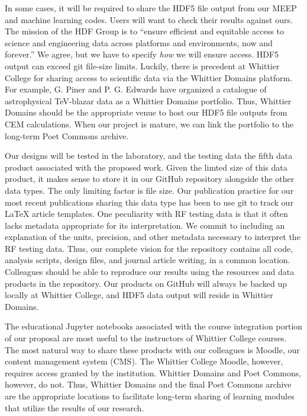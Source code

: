 \documentclass[11pt]{amsart}
\begin{document}
In some cases, it will be required to share the HDF5 file output from our MEEP and machine learning codes.  Users will want to check their results against ours.  The mission of the HDF Group is to ``ensure efficient and equitable access to science and engineering data across platforms and environments, now and forever.''  We agree, but we have to specify \textit{how} we will ensure access.  HDF5 output can exceed git file-size limits.  Luckily, there is precedent at Whittier College for sharing access to scientific data via the Whittier Domains platform.  For example, G. Piner and P. G. Edwards have organized a catalogue of astrophysical TeV-blazar data as a Whittier Domains portfolio.  Thus, Whittier Domains should be the appropriate venue to host our HDF5 file outputs from CEM calculations.  When our project is mature, we can link the portfolio to the long-term Poet Commons archive.  

Our designs will be tested in the laboratory, and the testing data the fifth data product associated with the proposed work.  Given the limted size of this data product, it makes sense to store it in our GitHub repository alongside the other data types.  The only limiting factor is file size.  Our publication practice for our most recent publications sharing this data type has been to use git to track our LaTeX article templates.  One peculiarity with RF testing data is that it often lacks metadata appropriate for its interpretation.  We commit to including an explanation of the units, precision, and other metadata necessary to interpret the RF testing data.  Thus, our complete vision for the repository contains all code, analysis scripts, design files, and journal article writing, in a common location.  Colleagues should be able to reproduce our results using the resources and data products in the repository.  Our products on GitHub will always be backed up locally at Whittier College, and HDF5 data output will reside in Whittier Domains.  

The educational Jupyter notebooks associated with the course integration portion of our proposal are most useful to the instructors of Whittier College courses.  The most natural way to share these products with our colleagues is Moodle, our content management system (CMS).  The Whittier College Moodle, however, requires access granted by the institution.  Whittier Domains and Poet Commons, however, do not.  Thus, Whittier Domains and the final Poet Commons archive are the appropriate locations to facilitate long-term sharing of learning modules that utilize the results of our research. 
\end{document}
